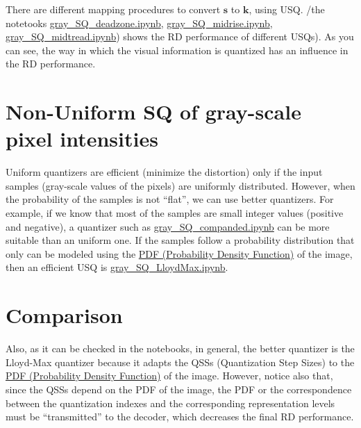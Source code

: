 There are different mapping procedures to convert $\mathbf{s}$ to
$\mathbf{k}$, using USQ. /the notetooks
\href{https://github.com/Sistemas-Multimedia/Sistemas-Multimedia.github.io/blob/master/contents/gray_SQ/gray_SQ_deadzone.ipynb}{gray\_SQ\_deadzone.ipynb},
\href{https://github.com/Sistemas-Multimedia/Sistemas-Multimedia.github.io/blob/master/contents/gray_SQ/gray_SQ_midrise.ipynb}{gray\_SQ\_midrise.ipynb},
\href{https://github.com/Sistemas-Multimedia/Sistemas-Multimedia.github.io/blob/master/contents/gray_SQ/gray_SQ_midtread.ipynb}{gray\_SQ\_midtread.ipynb})
shows the RD performance of different USQs). As you can see, the way
in which the visual information is quantized has an influence in the
RD performance.

\section{Non-Uniform SQ of gray-scale pixel intensities}
Uniform quantizers are efficient (minimize the distortion) only if the
input samples (gray-scale values of the pixels) are uniformly
distributed. However, when the probability of the samples is not
``flat'', we can use better quantizers. For example, if we know that
most of the samples are small integer values (positive and negative),
a quantizer such as
\href{https://github.com/Sistemas-Multimedia/Sistemas-Multimedia.github.io/blob/master/contents/gray_SQ/gray_SQ_companded.ipynb}{gray\_SQ\_companded.ipynb}
can be more suitable than an uniform one. If the samples follow a
probability distribution that only can be modeled using the
\href{https://en.wikipedia.org/wiki/Probability_density_function}{PDF
  (Probability Density Function)} of the image, then an efficient USQ
is
\href{https://github.com/Sistemas-Multimedia/Sistemas-Multimedia.github.io/blob/master/contents/gray_SQ/gray_SQ_LloydMax.ipynb}{gray\_SQ\_LloydMax.ipynb}. 

\section{Comparison}

 Also, as it can be checked in the notebooks, in
general, the better quantizer is the Lloyd-Max quantizer because it
adapts the QSSs (Quantization Step Sizes) to the
\href{https://en.wikipedia.org/wiki/Probability_density_function}{PDF
  (Probability Density Function)} of the image. However, notice also
that, since the QSSs depend on the PDF of the image, the PDF or the
correspondence between the quantization indexes and the corresponding
representation levels must be ``transmitted'' to the decoder, which
decreases the final RD performance.

